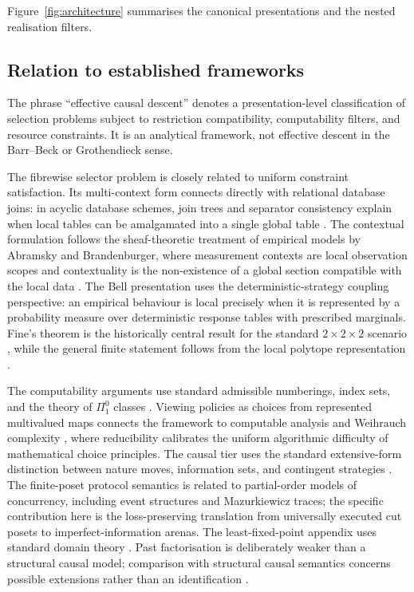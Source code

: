 \documentclass[11pt]{article}
\theoremstyle{plain}
\theoremstyle{definition}
\theoremstyle{remark}
\begin{document}
Figure~\ref{fig:architecture} summarises the canonical presentations and the
nested realisation filters.

\subsection*{Relation to established frameworks}

The phrase ``effective causal descent'' denotes a presentation-level
classification of selection problems subject to restriction compatibility,
computability filters, and resource constraints. It is an analytical framework,
not effective descent in the Barr--Beck or Grothendieck sense.

The fibrewise selector problem is closely related to uniform constraint
satisfaction. Its multi-context form connects directly with relational database
joins: in acyclic database schemes, join trees and separator consistency explain
when local tables can be amalgamated into a single global table
\cite{beerifagin}. The contextual formulation follows the sheaf-theoretic
treatment of empirical models by Abramsky and Brandenburger, where measurement
contexts are local observation scopes and contextuality is the non-existence of a
global section compatible with the local data \cite{abramsky}. The Bell
presentation uses the deterministic-strategy coupling perspective: an empirical
behaviour is local precisely when it is represented by a probability measure over
deterministic response tables with prescribed marginals. Fine's theorem is the
historically central result for the standard $2\times2\times2$ scenario
\cite{fine}, while the general finite statement follows from the local polytope
representation \cite{pitowsky}.

The computability arguments use standard admissible numberings, index sets, and
the theory of $\Pi^0_1$ classes \cite{kleene,jockuschsoare,rogers,soare}. Viewing
policies as choices from represented multivalued maps connects the framework to
computable analysis and Weihrauch complexity \cite{brattkagherardi,weihrauch},
where reducibility calibrates the uniform algorithmic difficulty of mathematical
choice principles. The causal tier uses the standard extensive-form distinction
between nature moves, information sets, and contingent strategies
\cite{osbornerubinstein}. The finite-poset protocol semantics is related to
partial-order models of concurrency, including event structures and Mazurkiewicz
traces; the specific contribution here is the loss-preserving translation from
universally executed cut posets to imperfect-information arenas. The
least-fixed-point appendix uses standard domain theory \cite{abramskyjung}. Past
factorisation is deliberately weaker than a structural causal model; comparison
with structural causal semantics concerns possible extensions rather than an
identification \cite{pearl}.
\end{document}
